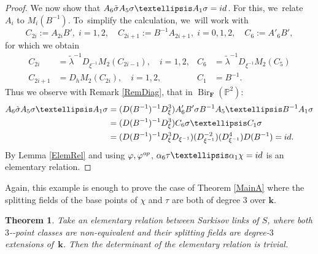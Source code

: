 \documentclass[10pt,a4paper]{amsart}
\providecommand{\nobreakdash}{\nobreak\hbox{-}}
\newcommand{\id}{\textup{id}}
\newcommand{\op}{\textup{op}}
\newtheorem{theorem}{Theorem}[section]
\theoremstyle{definition}
\newcommand{\kk}{{\boldsymbol{k}}}
\newcommand{\FF}{{\boldsymbol{F}}}
\DeclareMathOperator{\Bir}{Bir}
\begin{document}
\begin{proof}
We now show that $A_6 \tilde \sigma A_5 \sigma \dots A_1 \sigma = \id$. For this, we~relate $A_i$ to $M_i(B^{-1})$. To~simplify the calculation, we~will work with
\[
C_{2i} := A_{2i} B', \;i = 1,2,\quad C_{2i + 1} := B^{-1} A_{2i + 1}, \;i = 0,1,2, \quad C_{6} := A'_{6} B',
\]
for which we obtain
\begin{align*}
C_{2i} &= \tilde \lambda^{-1} D_{\xi^{-1}} M_2(C_{2i -1}), \quad i = 1,2,& C_{6} &= \tilde \lambda^{-1} D_{\xi^{-1}} M_2(C_{5})
\\
C_{2i + 1} &= D_h M_2(C_{2i}), \quad i=1,2, & C_1 &= B^{-1}.
\end{align*}
Thus we observe with Remark \ref{RemDiag}, that in $\Bir_{\FF}(\mathbb{P}^2)$:
\begin{align*}
A_6 \tilde \sigma A_5 \sigma \dots A_1 \sigma &= (D(B^{-1})^{-1}D_{\xi}^3) A'_6 B' \sigma B^{-1} A_5 \dots B^{-1}A_1 \sigma
\\
&= (D(B^{-1})^{-1}D_{\xi}^3) C_6\sigma \dots C_1 \sigma\\
&= (D(B^{-1})^{-1}D_{\xi}^3 D_{\xi^{-1}}) (D_{\xi^{-1}}^{-2}) (D_{\xi^{-1}}^4) D(B^{-1}) = \id.
\end{align*}
By Lemma \ref{ElemRel} and using $\varphi, \varphi^{\op}$, $\alpha_6 \tau \dots \alpha_1 \chi = \id$ is an elementary relation.
\end{proof}

Again, this example is enough to prove the case of Theorem \ref{MainA} where the splitting fields of the base points of $\chi$ and $\tau$ are both of degree $3$ over $\kk$.

\begin{theorem} \label{thm: elrel2}
Take an elementary relation between Sarkisov links of $S$, where both $3$\nobreakdash-point classes are non-equivalent and their splitting fields are degree-$3$ extensions of~$\kk$. Then the determinant of the elementary relation is trivial.
\end{theorem}
\end{document}
